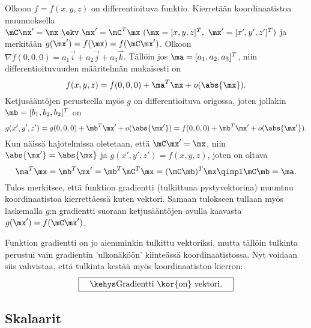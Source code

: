 \begin{Exa} Olkoon $f=f(x,y,z)$ on differentioituva funktio. Kierretään koordinaatistoa 
muunnoksella $\mC\mx'=\mx\ \ekv\ \mx'=\mC^T\mx\ (\mx=[x,y,z]^T,\ \mx'=[x',y',z']^T)$ ja 
merkitään $g(\mx')=f(\mx)=f(\mC\mx')$. Olkoon $\nabla f(0,0,0)= a_1\vec i+a_2\vec j+a_3\vec k$.
Tällöin jos $\ma=[a_1,a_2,a_3]^T$, niin differentioituvuuden määritelmän mukaisesti on
\[
f(x,y,z)=f(0,0,0)+\ma^T\mx + o(\abs{\mx}).
\]
Ketjusääntöjen perusteella myös $g$ on differentioituva origossa, joten jollakin 
$\mb=[b_1,b_2,b_2]^T$ on
\[
g(x',y',z')=g(0,0,0)+\mb^T\mx' + o(\abs{\mx'})=f(0,0,0)+\mb^T\mx' + o(\abs{\mx'}).
\]
Kun näissä hajotelmissa oletetaan, että $\mC\mx'=\mx$, niin $\abs{\mx'}=\abs{\mx}$ ja 
$g(x',y',z')=f(x,y,z)$, joten on oltava
\[
\ma^T\mx=\mb^T\mx'=\mb^T\mC^T\mx=(\mC\mb)^T\mx \qimpl \mC\mb=\ma.
\]
Tulos merkitsee, että funktion gradientti (tulkittuna pystyvektorina) muuntuu koordinaatistoa
kierrettäessä kuten vektori. Samaan tulokseen tullaan myös laskemalla $g$:n gradientti suoraan
ketjusääntöjen avulla kaavasta $g(\mx')=f(\mC\mx')$. \loppu
\end{Exa}
Funktion gradientti on jo aiemminkin tulkittu vektoriksi, mutta tällöin tulkinta perustui vain
gradientin 'ulkonäköön' kiinteässä koordinaatistossa. Nyt voidaan siis vahvistaa, että tulkinta
kestää myös koordinaatiston kierron:
\[
\boxed{\quad\kehys \text{Gradientti \kor{on} vektori}. \quad}
\]

\subsection{Skalaarit}

